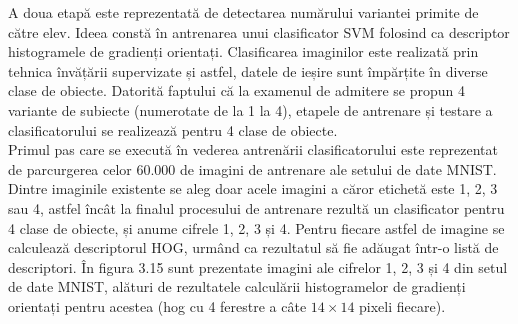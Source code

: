 \documentclass[a4paper,12pt]{report}
\newcommand\tab[1][1cm]{\hspace*{#1}}
\begin{document}
\tab A doua etapă este reprezentată de detectarea numărului variantei primite de către elev. Ideea constă în antrenarea unui clasificator SVM folosind ca descriptor histogramele de gradienți orientați. Clasificarea imaginilor este realizată prin tehnica învățării supervizate și astfel, datele de ieșire sunt împărțite în diverse clase de obiecte. Datorită faptului că la examenul de admitere se propun 4 variante de subiecte (numerotate de la 1 la 4), etapele de antrenare și testare a clasificatorului se realizează pentru 4 clase de obiecte. 
\\ \tab Primul pas care se execută în vederea antrenării clasificatorului este reprezentat de parcurgerea celor 60.000 de imagini de antrenare ale setului de date MNIST. Dintre imaginile existente se aleg doar acele imagini a căror etichetă este 1, 2, 3 sau 4, astfel încât la finalul procesului de antrenare rezultă un clasificator pentru 4 clase de obiecte, și anume cifrele 1, 2, 3 și 4. Pentru fiecare astfel de imagine se calculează descriptorul HOG, urmând ca rezultatul să fie adăugat într-o listă de descriptori. În figura 3.15 sunt prezentate imagini ale cifrelor 1, 2, 3 și 4 din setul de date MNIST, alături de rezultatele calculării histogramelor de gradienți orientați pentru acestea (hog cu 4 ferestre a câte $14\times14$ pixeli fiecare).
\end{document}
